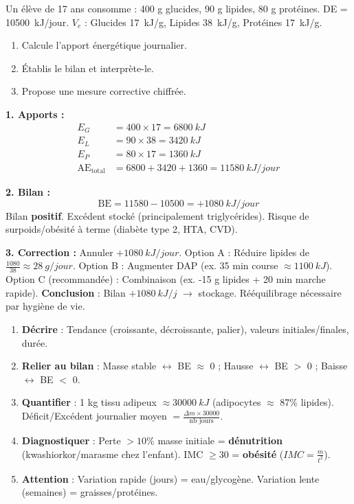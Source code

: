 \documentclass[11pt]{article}
\begin{document}
\begin{exoresolu}
Un élève de 17 ans consomme : 400 g glucides, 90 g lipides, 80 g protéines. DE = \SI{10500}{kJ/jour}. $V_e$ : Glucides \SI{17}{kJ/g}, Lipides \SI{38}{kJ/g}, Protéines \SI{17}{kJ/g}.
\begin{enumerate}
\item Calcule l'apport énergétique journalier.
\item Établis le bilan et interprète-le.
\item Propose une mesure corrective chiffrée.
\end{enumerate}
\tcblower
\textbf{1. Apports :}
\begin{align*}
E_G &= 400 \times 17 = \SI{6800}{kJ} \\
E_L &= 90 \times 38 = \SI{3420}{kJ} \\
E_P &= 80 \times 17 = \SI{1360}{kJ} \\
\text{AE}_{\text{total}} &= 6800 + 3420 + 1360 = \SI{11580}{kJ/jour}
\end{align*}

\textbf{2. Bilan :}
\[ \text{BE} = 11580 - 10500 = +\SI{1080}{kJ/jour} \]
Bilan \textbf{positif}. Excédent stocké (principalement triglycérides). Risque de surpoids/obésité à terme (diabète type 2, HTA, CVD).

\textbf{3. Correction :}
Annuler $+\SI{1080}{kJ/jour}$.
Option A : Réduire lipides de $\frac{1080}{38} \approx \SI{28}{g/jour}$.
Option B : Augmenter DAP (ex. 35 min course $\approx \SI{1100}{kJ}$).
Option C (recommandée) : Combinaison (ex. -15 g lipides + 20 min marche rapide).
\textbf{Conclusion} : Bilan $+\SI{1080}{kJ/j}$ $\rightarrow$ stockage. Rééquilibrage nécessaire par hygiène de vie.
\end{exoresolu}

\begin{methode}
\begin{enumerate}
\item \textbf{Décrire} : Tendance (croissante, décroissante, palier), valeurs initiales/finales, durée.
\item \textbf{Relier au bilan} : Masse stable $\leftrightarrow$ BE $\approx$ 0 ; Hausse $\leftrightarrow$ BE $>$ 0 ; Baisse $\leftrightarrow$ BE $<$ 0.
\item \textbf{Quantifier} : 1 kg tissu adipeux $\approx \SI{30000}{kJ}$ (adipocytes $\approx$ 87\% lipides). Déficit/Excédent journalier moyen $= \frac{\Delta m \times 30000}{\text{nb jours}}$.
\item \textbf{Diagnostiquer} : Perte $> 10\%$ masse initiale = \textbf{dénutrition} (kwashiorkor/marasme chez l'enfant). IMC $\geq 30$ = \textbf{obésité} ($IMC = \frac{m}{t^2}$).
\item \textbf{Attention} : Variation rapide (jours) = eau/glycogène. Variation lente (semaines) = graisses/protéines.
\end{enumerate}
\end{methode}
\end{document}
